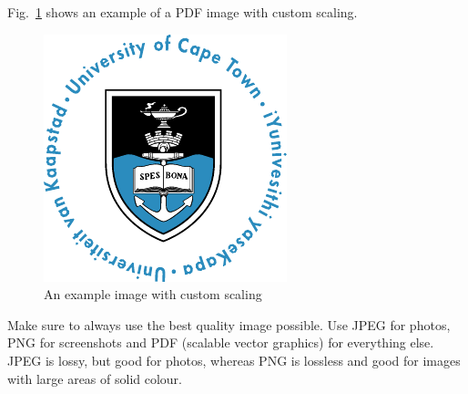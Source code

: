 Fig.~\ref{fig:UCT.pdf} shows an example of a PDF image with custom scaling.

\begin{figure}[ht]
\centering
\includegraphics[width=0.35\columnwidth]{3_Chapters/5_Chapter_Results/Figures/UCT.pdf}
\caption{An example image with custom scaling}
\label{fig:UCT.pdf}
\end{figure}

Make sure to always use the best quality image possible.  Use JPEG for photos, PNG for screenshots and PDF (scalable vector graphics) for everything else.  JPEG is lossy, but good for photos, whereas PNG is lossless and good for images with large areas of solid colour.\\

